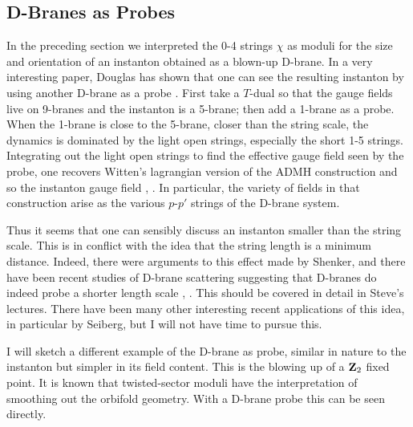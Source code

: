\documentclass[12pt]{article}
\def\Z{{\bf Z}}
\begin{document}
\subsection{D-Branes as Probes}

In the preceding section we interpreted the 0-4 strings $\chi$ as moduli for the
size and orientation of an instanton obtained as a blown-up D-brane.  In a very
interesting paper, Douglas has shown that one can see the resulting instanton by
using another D-brane as a probe \cite{dougprobe}.  First take a $T$-dual so that
the gauge fields live on 9-branes and the instanton is a 5-brane; then add a
1-brane as a probe.  When the 1-brane is close to the 5-brane, closer than the
string scale, the dynamics is dominated by the light open strings, especially
the short 1-5 strings.  Integrating out the light open strings to find the
effective gauge field seen by the probe, one recovers Witten's lagrangian
version of the ADMH construction and so the
instanton gauge field \cite{witadmh}, \cite{admh}.  In particular, the
variety of fields in that construction arise as the various
$p$-$p'$ strings of the D-brane system.

Thus it seems that one can sensibly discuss an instanton smaller than the
string scale.  This is in conflict with the idea that the
string length is a minimum distance.  Indeed, there were arguments to this
effect made by Shenker, \cite{shenk2} and there have been recent studies of
D-brane scattering suggesting that D-branes do indeed probe a shorter length
scale \cite{bachas}, \cite{short}. This should be covered in detail in
Steve's lectures.  There have been many other interesting recent applications of
this idea, in particular by Seiberg, but I will not have time to pursue this.

I will sketch a different example of the D-brane as probe, \cite{tensors}
similar in nature to the instanton but simpler in its field content.  This is
the blowing up of a $\Z_2$ fixed point.  It is known that twisted-sector moduli
have the interpretation of smoothing out the orbifold geometry.  With a D-brane
probe this can be seen directly.
\end{document}
